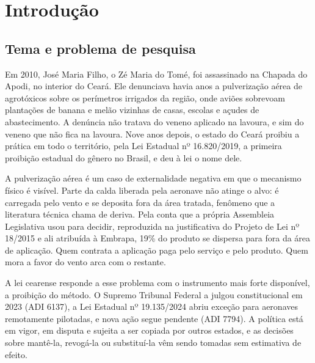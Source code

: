 
\chapter{Introdução}
\label{cap:introducao}

\section{Tema e problema de pesquisa}
\label{sec:tema}

Em 2010, José Maria Filho, o Zé Maria do Tomé, foi assassinado na Chapada do
Apodi, no interior do Ceará. Ele denunciava havia anos a pulverização aérea de
agrotóxicos sobre os perímetros irrigados da região, onde aviões sobrevoam
plantações de banana e melão vizinhas de casas, escolas e açudes de
abastecimento. A denúncia não tratava do veneno aplicado na lavoura, e sim do
veneno que não fica na lavoura. Nove anos depois, o estado do Ceará proibiu a
prática em todo o território, pela Lei Estadual nº 16.820/2019, a primeira
proibição estadual do gênero no Brasil, e deu à lei o nome dele.

A pulverização aérea é um caso de externalidade negativa em que o mecanismo
físico é visível. Parte da calda liberada pela aeronave não atinge o alvo: é
carregada pelo vento e se deposita fora da área tratada, fenômeno que a
literatura técnica chama de deriva. Pela conta que a própria Assembleia
Legislativa usou para decidir, reproduzida na justificativa do Projeto de Lei
nº 18/2015 e ali atribuída à Embrapa, 19\% do produto se dispersa para fora da
área de aplicação. Quem contrata a aplicação paga pelo serviço e pelo produto.
Quem mora a favor do vento arca com o restante.

A lei cearense responde a esse problema com o instrumento mais forte
disponível, a proibição do método. O Supremo Tribunal Federal a julgou
constitucional em 2023 (ADI 6137), a Lei Estadual nº 19.135/2024 abriu exceção
para aeronaves remotamente pilotadas, e nova ação segue pendente (ADI 7794). A
política está em vigor, em disputa e sujeita a ser copiada por outros estados,
e as decisões sobre mantê-la, revogá-la ou substituí-la vêm sendo tomadas sem
estimativa de efeito.


